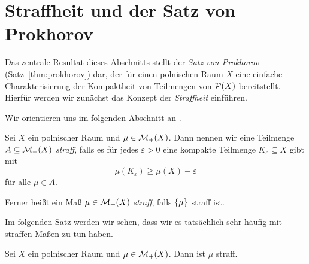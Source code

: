 \documentclass[../main/main.tex]{subfiles}
\begin{document}
	
	\section{Straffheit und der Satz von Prokhorov}
	
	Das zentrale Resultat dieses Abschnitts stellt der \emph{Satz von Prokhorov} (Satz~\ref{thm:prokhorov}) dar, der für einen polnischen Raum $X$ eine einfache Charakterisierung der Kompaktheit von Teilmengen von $\mathcal{P}(X)$ bereitstellt. Hierfür werden wir zunächst das Konzept der \emph{Straffheit} einführen.
	
	Wir orientieren uns im folgenden Abschnitt an \cite[Kapitel 4.14]{Simon.2015}.
	
	\begin{Definition}
		Sei $X$ ein polnischer Raum und $\mu \in \mathcal{M}_{+}(X)$. Dann nennen wir 
		eine Teilmenge $A \subseteq \mathcal{M}_{+}(X)$ \emph{straff}, falls es für jedes $\varepsilon > 0$ eine kompakte Teilmenge
		$K_\varepsilon \subseteq X$ gibt mit 
		\[ \mu(K_\varepsilon) \geq \mu(X)  - \varepsilon \]
		für alle $\mu \in A$.
		
		Ferner heißt ein Maß $\mu \in \mathcal{M}_{+}(X)$ \emph{straff}, falls $\left\{\mu\right\}$ straff ist.
	\end{Definition}

	Im folgenden Satz werden wir sehen, dass wir es tatsächlich sehr häufig mit straffen Maßen zu tun haben.
	
	\begin{Satz}
		\label{thm:tightness}
		Sei $X$ ein polnischer Raum und $\mu \in \mathcal{M}_{+}(X)$. Dann ist $\mu$ straff.
	\end{Satz}
	
\end{document}
